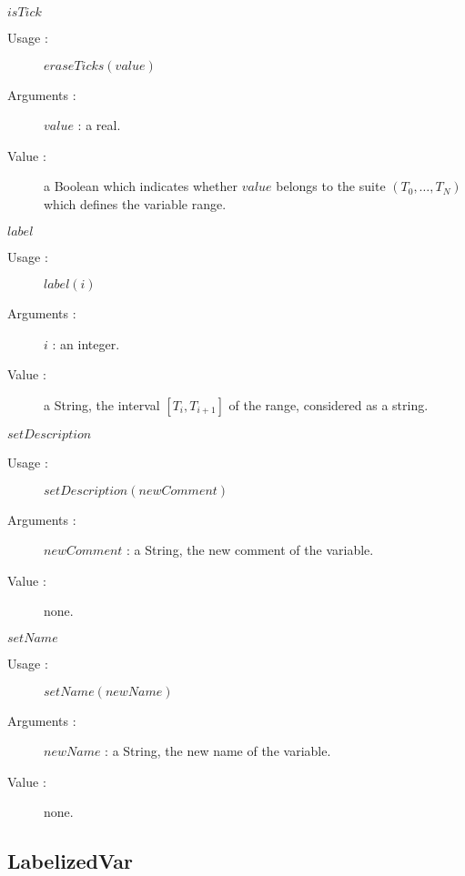 \begin{description}
\begin{description}
  \item $isTick$
    \begin{description}
    \item[Usage :]  $eraseTicks(value)$
    \item[Arguments :]  $value$ : a real.
    \item[Value :]  a Boolean which indicates whether $value$ belongs to the suite $(T_0, \hdots, T_N)$ which defines the variable range.
    \end{description}
    \bigskip

  \item $label$
    \begin{description}
    \item[Usage :]  $label(i)$
    \item[Arguments :] $i$ : an integer.
    \item[Value :]  a String, the interval $[T_i, T_{i+1}]$ of the range, considered as a string.
    \end{description}
    \bigskip


  \item $setDescription$
    \begin{description}
    \item[Usage :]  $setDescription(newComment)$
    \item[Arguments :] $newComment$ : a String, the new comment of the variable.
    \item[Value :]  none.
    \end{description}
    \bigskip

  \item $setName$
    \begin{description}
    \item[Usage :]  $setName(newName)$
    \item[Arguments :] $newName$ :  a String, the new name of the variable.
    \item[Value :]  none.
    \end{description}

  \end{description}


\end{description}









\newpage \subsection{LabelizedVar}

